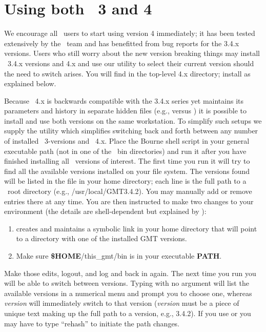 %
%

\chapter{Using both \gmt\ 3 and 4}
\label{app:P}
\thispagestyle{headings}

We encourage all \GMT\ users to start using version 4 immediately; it has been tested extensively by
the \GMT\ team and has benefitted from bug reports for the 3.4.x versions.  Users who still worry about the
new version breaking things may install \GMT\ 3.4.x versions and 4.x and use our utility 
to select their current version should the need to switch arises.  You will find 
in the top-level \GMT 4.x directory; install as explained below.

Because \GMT\ 4.x is backwards compatible with the 3.4.x series yet maintains its parameters
and history in separate hidden files (e.g.,  versus )
it is possible to install and use both versions on the same workstation.  To simplify such
setups we supply the utility  which simplifies switching back and forth
between any number of installed \GMT\ 3-versions and \GMT\ 4.x.  Place the  Bourne
shell script in your
general executable path (not in one of the \GMT\ bin directories) and run it after you have
finished installing all \GMT\ versions of interest.  The first time you run 
it will try to find all the available versions installed on your file system.  The versions
found will be listed in the file  in your home directory; each line
is the full path to a \GMT\ root directory (e.g., /usr/local/GMT3.4.2).  You may
manually add or remove entries there at any time.  You are then instructed to make two
changes to your environment (the details are shell-dependent but explained by ):
\begin{enumerate}
\item {} creates and maintains a symbolic link  in your home
directory that will point to a directory with one of the installed GMT versions.
\item Make sure {\bf \$HOME}/this\_gmt/bin is in your executable {\bf PATH}.
\end{enumerate}
Make those edits, logout, and log and back in again.  The next time you run 
you will be able to switch between versions.  Typing  with no argument will list the
available versions in a numerical menu and prompt you to choose one, whereas  {\it version}
will immediately switch to that version ({\it version} must be a piece of unique text making
up the full path to a version, e.g., 3.4.2).  If you use  or  you may have to type
``rehash'' to initiate the path changes.
